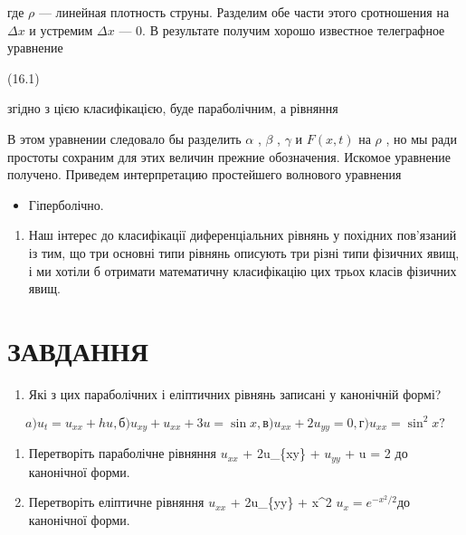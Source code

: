 \documentclass[
  ukrainian,
]{article}
\providecommand{\tightlist}{%
  \setlength{\itemsep}{0pt}\setlength{\parskip}{0pt}}
\begin{document}
где \(\rho\) --- линейная плотность струны. Разделим обе части этого
сротношения на \(\Delta x\) и устремим \(\Delta x\) --- 0. В результате
получим хорошо известное телеграфное уравнение

(16.1)

згідно з цією класифікацією, буде параболічним, а рівняння

В этом уравнении следовало бы разделить \(\alpha\) , \(\beta\) ,
\(\gamma\) и \(F(x,t)\) на \(\rho\) , но мы ради простоты сохраним для
этих величин прежние обозначения. Искомое уравнение получено. Приведем
интерпретацию простейшего волнового уравнения

\begin{itemize}
\tightlist
\item
  Гіперболічно.
\end{itemize}

\begin{enumerate}
\def\labelenumi{\arabic{enumi}.}
\setcounter{enumi}{1}
\tightlist
\item
  Наш інтерес до класифікації диференціальних рівнянь у похідних
  пов'язаний із тим, що три основні типи рівнянь описують три різні типи
  фізичних явищ, і ми хотіли б отримати математичну класифікацію цих
  трьох класів фізичних явищ.
\end{enumerate}

\section{ЗАВДАННЯ}\label{ux437ux430ux432ux434ux430ux43dux43dux44f-2}

\begin{enumerate}
\def\labelenumi{\arabic{enumi}.}
\tightlist
\item
  Які з цих параболічних і еліптичних рівнянь записані у канонічній
  формі?
\end{enumerate}

\[
a) u_t = u_{xx} + hu,
б) u_{xy} + u_{xx} + 3u = \sin x,
в) u_{xx} + 2u_{yy} = 0,
г) u_{xx} = \sin^2 x?
\]

\begin{enumerate}
\def\labelenumi{\arabic{enumi}.}
\setcounter{enumi}{1}
\item
  Перетворіть параболічне рівняння \(u_{xx}\) + 2u\_\{xy\} + \(u_{yy}\)
  + u = 2 до канонічної форми.
\item
  Перетворіть еліптичне рівняння \(u_{xx}\) + 2u\_\{yy\} + x\^{}2
  \(u_x = e^{-x^2/2}\)до канонічної форми.
\end{enumerate}
\end{document}
